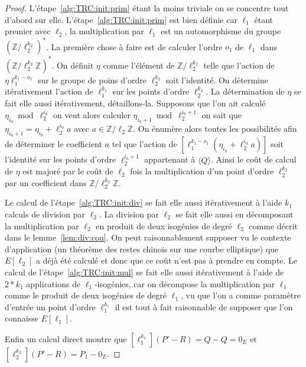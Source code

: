 \documentclass[10pt,a4paper]{book}
\theoremstyle{plain}
\theoremstyle{definition}
\theoremstyle{definition}
\theoremstyle{definition}
\theoremstyle{definition}
\theoremstyle{remark}
\theoremstyle{remark}
\theoremstyle{definition}
\begin{document}
\begin{proof}
L'étape~\ref{alg:TRC:init:prim} étant la moins triviale on se concentre tout 
d'abord sur elle. L'étape~\ref{alg:TRC:init:prim} est bien définie car 
$\ell_1$ étant premier avec $\ell_2$, la multiplication par $\ell_1$ est un 
automorphisme du groupe $(\mathbb{Z}/ \ell_2^{k_2})^*$. La première chose à faire 
est de calculer l'ordre $o_1$ de $\ell_1$ dans 
$(\mathbb{Z}/\ell_2^{k_2} \mathbb{Z})^*$. On définit $\eta$ comme l'élément de 
$\mathbb{Z}/ \ell_2^{k_2}$ telle que l'action de $\eta \ell_1^{k_1-o_1}$ sur le
 groupe de poins d'ordre $\ell_2^{k_2}$ soit l'identité. On détermine 
 itérativement l'action de $\ell_1^{k_1}$ sur les points d'ordre 
 $\ell_2^{k_2}$.  La détermination de $\eta$ se fait elle aussi itérativement, 
 détaillons-la. Supposons que l'on ait calculé $\eta_{i_0} \bmod \ell_2^{i_0}$ 
 on veut alors calculer $\eta_{i_0+1} \bmod \ell_2^{i_0+1}$ on sait que 
 $\eta_{i_0+1} = \eta_{i_0} + \ell_2^{i_0} a $ avec 
 $a \in \mathbb{Z}/ \ell_2 \mathbb{Z}$. On énumère alors toutes les 
 possibilités afin de déterminer le coefficient $a$ tel que l'action de  
 $[\ell_1^{k_1-o_1}(\eta_{i_0} + \ell_2^{i_0} a)]$ soit l'identité sur les 
 points d'ordre $\ell_2^{i_0+1}$ appartenant à $\langle Q \rangle$. Ainsi le 
 coût de calcul de $\eta$ est majoré par le coût de $\ell_2$ fois la 
 multiplication d'un point d'ordre $\ell_2^{k_2}$ par un coefficient dans 
 $\mathbb{Z}/ \ell_2^{k_2} \mathbb{Z}$.
 
 Le calcul de l'étape~\ref{alg:TRC:init:div} se fait elle aussi itérativement à 
 l'aide $k_1$ calculs de division par $\ell_2$. La division par $\ell_2$ se 
 fait elle aussi en décomposant la multiplication par $\ell_2$ en produit de 
 deux isogénies de degré $\ell_2$ comme décrit dans le lemme~\ref{lem:div:cou}. 
 On peut raisonnablement supposer vu le contexte d'application (un théorème des
 restes chinois sur une courbe elliptique) que $E[\ell_2]$ a déjà été calculé 
 et donc que ce coût n'est pas à prendre en compte. Le calcul de 
 l'étape~\ref{alg:TRC:init:mul} se fait elle aussi itérativement à l'aide de 
 $2*k_1$ applications de $\ell_1$-isogénies, car on décompose la multiplication
 par $\ell_1$ comme le produit de deux isogénies de degré $\ell_1$, vu que l'on
 a comme paramètre d'entrée un point d'ordre $\ell_1^{k_1}$ il est tout à fait 
 raisonnable de supposer que l'on connaisse $E[\ell_1]$.
 
 Enfin un calcul direct montre que $[\ell_1^{k_1}](P'-R)=Q-Q=0_E$ et 
 $[\ell_2^{k_2}](P'-R)=P_1-0_E$.
\end{proof}
\end{document}
